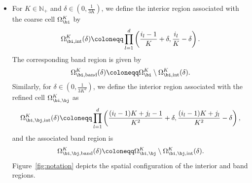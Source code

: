 \documentclass[11pt]{article}
\begin{document}
\begin{itemize}
    
    \item For $K \in \mathbb{N}_{+}$ and $\delta \in (0, \frac{1}{3K})$, we define the interior region associated with the coarse cell $\Omega_{\bi}^{K}$ by
    \begin{equation*}
        \Omega_{\bi,\text{int}}^{K}(\delta) \coloneqq  \prod_{l=1}^d \left( \frac{i_l-1}{K} + \delta , \frac{ i_l}{K} - \delta\right).
    \end{equation*}
    The corresponding band region is given by 
    \begin{equation*}
        \Omega_{\bi,\text{band}}^{K}(\delta) \coloneqq  \Omega_{\bi}^{K}  \setminus \Omega_{\bi,\text{int}}^{K}(\delta).
    \end{equation*}
    Similarly, for $\delta \in (0, \tfrac{1}{3K^{2}})$, we define the interior region associated with the refined cell $\Omega_{\bi,\bj}^{K}$ as
    \begin{equation*}
        \Omega_{\bi, \bj, \mathrm{int}}^{ K}(\delta) \coloneqq   \prod_{l=1}^d \left( \frac{(i_l-1)K + j_l -1 }{K^2} + \delta, \frac{(i_l-1)K + j_l }{K^2} - \delta \right),
    \end{equation*}
    and the associated band region is
    \begin{equation*}
        \Omega_{\bi, \bj , \mathrm{band}}^{ K}(\delta) \coloneqq  \Omega_{\bi, \bj}^{ K} \setminus \Omega_{\bi, \bj, \mathrm{int}}^{ K}(\delta) .
    \end{equation*}
    Figure~\ref{fig:notation} depicts the spatial configuration of the interior and band regions.


\end{itemize}
\end{document}
